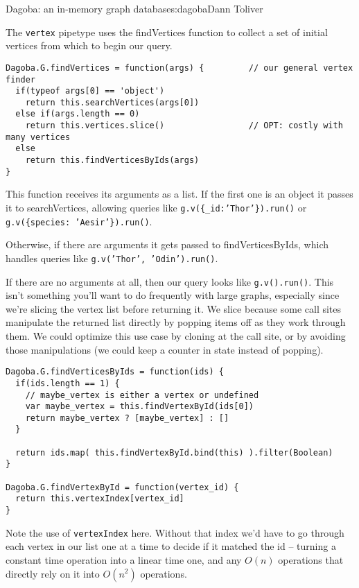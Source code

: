 \begin{aosachapter}{Dagoba: an in-memory graph database}{s:dagoba}{Dann Toliver}
\label{finding}

The \texttt{vertex} pipetype uses the findVertices function to collect a
set of initial vertices from which to begin our query.

\begin{verbatim}
Dagoba.G.findVertices = function(args) {         // our general vertex finder
  if(typeof args[0] == 'object')
    return this.searchVertices(args[0])
  else if(args.length == 0)
    return this.vertices.slice()                 // OPT: costly with many vertices
  else
    return this.findVerticesByIds(args)
}
\end{verbatim}

This function receives its arguments as a list. If the first one is an
object it passes it to searchVertices, allowing queries like
\texttt{g.v(\{\_id:'Thor'\}).run()} or
\texttt{g.v(\{species: 'Aesir'\}).run()}.

Otherwise, if there are arguments it gets passed to findVerticesByIds,
which handles queries like \texttt{g.v('Thor', 'Odin').run()}.

If there are no arguments at all, then our query looks like
\texttt{g.v().run()}. This isn't something you'll want to do frequently
with large graphs, especially since we're slicing the vertex list before
returning it. We slice because some call sites manipulate the returned
list directly by popping items off as they work through them. We could
optimize this use case by cloning at the call site, or by avoiding those
manipulations (we could keep a counter in state instead of popping).

\begin{verbatim}
Dagoba.G.findVerticesByIds = function(ids) {
  if(ids.length == 1) {
    // maybe_vertex is either a vertex or undefined
    var maybe_vertex = this.findVertexById(ids[0])                
    return maybe_vertex ? [maybe_vertex] : []
  }
  
  return ids.map( this.findVertexById.bind(this) ).filter(Boolean) 
}

Dagoba.G.findVertexById = function(vertex_id) {
  return this.vertexIndex[vertex_id] 
}
\end{verbatim}

Note the use of \texttt{vertexIndex} here. Without that index we'd have
to go through each vertex in our list one at a time to decide if it
matched the id -- turning a constant time operation into a linear time
one, and any $O(n)$ operations that directly rely on it into $O(n^2)$
operations.


\end{aosachapter}
